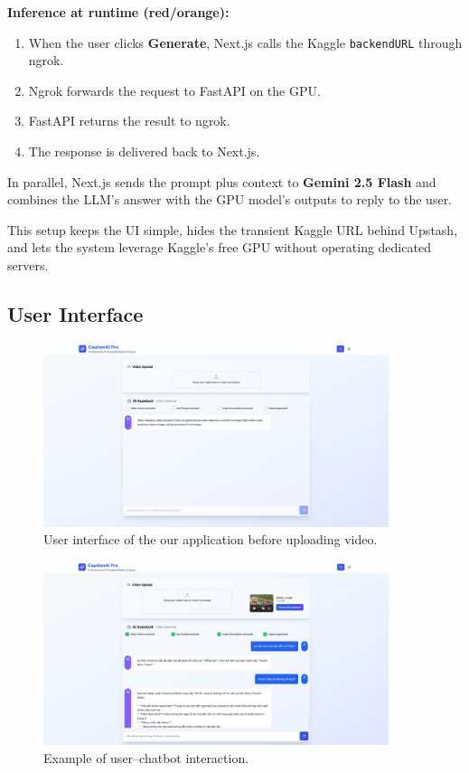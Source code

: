 \textbf{Inference at runtime (red/orange):}
\begin{enumerate}
    \item When the user clicks \textbf{Generate}, Next.js calls the Kaggle \texttt{backendURL} through ngrok.
    \item Ngrok forwards the request to FastAPI on the GPU.
    \item FastAPI returns the result to ngrok.
    \item The response is delivered back to Next.js.
\end{enumerate}

In parallel, Next.js sends the prompt plus context to \textbf{Gemini 2.5 Flash} and combines the LLM's answer with the GPU model's outputs to reply to the user. 

This setup keeps the UI simple, hides the transient Kaggle URL behind Upstash, and lets the system leverage Kaggle's free GPU without operating dedicated servers.



\subsection{User Interface}



\begin{figure}[H]
\centering
\includegraphics[width=0.9\textwidth]{image/UI/home.png}
\caption{User interface of the our application before uploading video.}
\label{fig:home_ui}
\end{figure}

\begin{figure}[H]
\centering
\includegraphics[width=0.9\textwidth]{image/UI/example.png}
\caption{Example of user--chatbot interaction.}
\label{fig:example_ui}
\end{figure}

